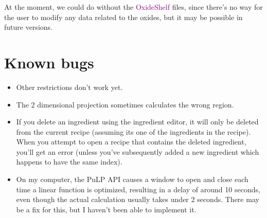 \documentclass[a4paper,10pt]{article}
\def\'{\textquotesingle}
\def\green{\textcolor{Purple}}
\begin{document}
At the moment, we could do without the \green{OxideShelf} files, since there's no way for the user to modify any data related to the oxides, but it may be possible in future versions.

\section{Known bugs}
\begin{itemize}
\item Other restrictions don't work yet.
\item The 2 dimensional projection sometimes calculates the wrong region.
\item If you delete an ingredient using the ingredient editor, it will only be deleted from the current recipe (assuming it\'s one of the ingredients in the recipe). When you attempt to open a recipe that contains the deleted ingredient, you'll get an error (unless you've subsequently added a new ingredient which happens to have the same index).
\item On my computer, the PuLP API causes a window to open and close each time a linear function is optimized, resulting in a delay of around 10 seconds, even though the actual calculation usually takes under 2 seconds. There may be a fix for this, but I haven't been able to implement it.
\end{itemize}
\end{document}

